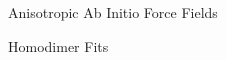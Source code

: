 \begin{chapter}{Anisotropic Ab Initio Force Fields}
\label{ch:mastiff}



\begin{subappendices}
\begin{section}{Homodimer Fits}
\label{sec:mastiff-fits}
\end{section}
\end{subappendices}

\end{chapter}
